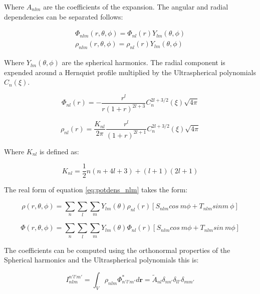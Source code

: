 \documentclass[14pt]{article}
\begin{document}
Where $A_{nlm}$ are the coefficients of the expansion. The angular and radial
dependencies can be separated follows:


\begin{equation}\label{eq:potdens_nlm}
  \begin{aligned}
  \Phi_{nlm}(r, \theta, \phi) = \Phi_{nl}(r)Y_{lm}(\theta, \phi)\\ 
  \rho_{nlm}(r, \theta, \phi) = \rho_{nl}(r)Y_{lm}(\theta, \phi) 
  \end{aligned}
\end{equation}


Where $Y_{lm}(\theta,\phi)$ are the spherical harmonics. The radial component
is expended around a Hernquist profile multiplied by the Ultraspherical
polynomials $C_{n}(\xi)$.


\begin{equation}
  \Phi_{nl}(r) = - \dfrac{r^l}{r(1+r)^{2l+3}}C_{n}^{2l+3/2}(\xi)\sqrt{4\pi}
\end{equation}

\begin{equation}
  \rho_{nl}(r) = \dfrac{K_{nl}}{2\pi}\dfrac{r^l}{(1+r)^{2l+1}}C_{n}^{2l+3/2}(\xi)\sqrt{4\pi}
\end{equation}


Where $K_{nl}$ is defined as:

\begin{equation}
    K_{nl}=\dfrac{1}{2}n(n+4l+3) +(l+1)(2l+1)
\end{equation}

The real form of equation \ref{eq:potdens_nlm} takes the form: 

\begin{equation}
  \rho(r, \theta, \phi) = \sum_{n} \sum_l \sum_m Y_{lm}(\theta) \rho_{nl}(r)
  \left[ S_{nlm} cos\ m \phi + T_{nlm} sin m\ \phi \right]
\end{equation}


\begin{equation}
  \Phi(r, \theta, \phi) = \sum_{n} \sum_l \sum_m Y_{lm}(\theta) \Phi_{nl}(r)
  \left[ S_{nlm} cos\ m\phi + T_{nlm} sin\ m \phi \right]
\end{equation}


The coefficients can be computed using the orthonormal properties of the
Spherical harmonics and the Ultraspherical polynomials this is:

\begin{equation}\label{eq:energy}
  I_{nlm}^{n'l'm'} = \int_V \rho_{nlm} \Phi_{n'l'm'}^*  d\textbf{r} = \tilde{A}_{nl} \delta_{nn'}
  \delta_{ll'} \delta_{mm'} 
\end{equation}
\end{document}
